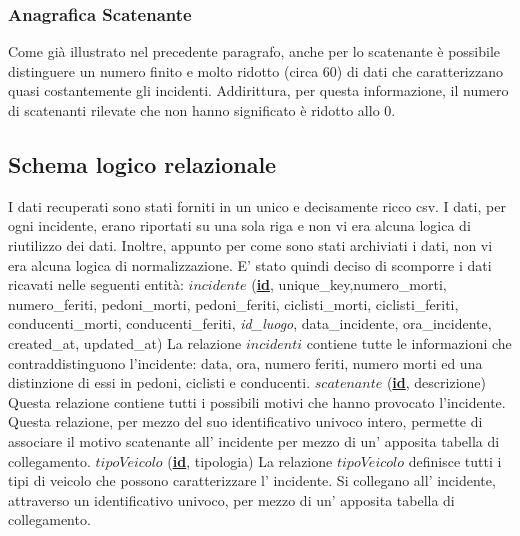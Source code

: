 \documentclass[12pt, a4paper]{scrartcl}
\begin{document}
\subsubsection*{Anagrafica Scatenante}
Come già illustrato nel precedente paragrafo, anche per lo scatenante è possibile distinguere un numero finito e molto ridotto (circa 60) di dati che caratterizzano quasi costantemente gli incidenti. Addirittura, per questa informazione, il numero di scatenanti rilevate che non hanno significato è ridotto allo 0.

\subsection*{Schema logico relazionale}
I dati recuperati sono stati forniti in un unico e decisamente ricco csv. I dati, per ogni incidente, erano riportati su una sola riga e non vi era alcuna logica di riutilizzo dei dati. Inoltre, appunto per come sono stati archiviati i dati, non vi era alcuna logica di normalizzazione.
E' stato quindi deciso di scomporre i dati ricavati nelle seguenti entità:
\newline
\newline
$incidente$ (\textbf{\underline{id}}, unique\_key,numero\_morti, numero\_feriti, pedoni\_morti, pedoni\_feriti, ciclisti\_morti, ciclisti\_feriti, conducenti\_morti, conducenti\_feriti, \textit{id\_luogo}, data\_incidente, ora\_incidente, created\_at, updated\_at)
\newline
La relazione $incidenti$ contiene tutte le informazioni che contraddistinguono l'incidente: data, ora, numero feriti, numero morti ed una distinzione di essi in pedoni, ciclisti e conducenti.
\newline
\newline
$scatenante$ (\textbf{\underline{id}}, descrizione)
\newline
Questa relazione contiene tutti i possibili motivi che hanno provocato l'incidente. Questa relazione, per mezzo del suo identificativo univoco intero, permette di associare il motivo scatenante all' incidente per mezzo di un' apposita tabella di collegamento.
\newline
\newline
$tipoVeicolo$ (\textbf{\underline{id}}, tipologia)
\newline
La relazione $tipoVeicolo$ definisce tutti i tipi di veicolo che possono caratterizzare l' incidente. Si collegano all' incidente, attraverso un identificativo univoco, per mezzo di un' apposita tabella di collegamento.
\newline
\end{document}
